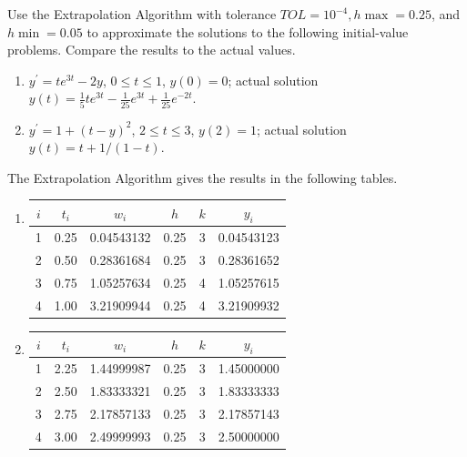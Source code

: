 \begin{myexercise}%
Use the Extrapolation Algorithm with tolerance $T O L=10^{-4}, h \max =0.25$, and $h \min =0.05$ to approximate the solutions to the following initial-value problems. Compare the results to the actual values.\\
\begin{enumerate}[label=(\alph*)]
\item $y^{\prime}=t e^{3 t}-2 y$, $0 \leq t \leq 1$, $y(0)=0$; actual solution $y(t)=\frac{1}{5} t e^{3 t}-\frac{1}{25} e^{3 t}+\frac{1}{25} e^{-2 t}$.\\
\item $y^{\prime}=1+(t-y)^{2}$, $2 \leq t \leq 3$, $y(2)=1$; actual solution $y(t)=t+1 /(1-t)$.
\end{enumerate}

\begin{mysolution}
The Extrapolation Algorithm gives the results in the following tables.\\
\begin{enumerate}[label=(\alph*)]
\item
\begin{center}
\begin{tabular}{cccccc}
\hline
$i$ & $t_{i}$ & $w_{i}$ & $h$ & $k$ & $y_{i}$ \\
\hline
1 & 0.25 & 0.04543132 & 0.25 & 3 & 0.04543123 \\
2 & 0.50 & 0.28361684 & 0.25 & 3 & 0.28361652 \\
3 & 0.75 & 1.05257634 & 0.25 & 4 & 1.05257615 \\
4 & 1.00 & 3.21909944 & 0.25 & 4 & 3.21909932 \\
\hline
\end{tabular}
\end{center}

\item

\begin{center}
\begin{tabular}{cccccc}
\hline
$i$ & $t_{i}$ & $w_{i}$ & $h$ & $k$ & $y_{i}$ \\
\hline
1 & 2.25 & 1.44999987 & 0.25 & 3 & 1.45000000 \\
2 & 2.50 & 1.83333321 & 0.25 & 3 & 1.83333333 \\
3 & 2.75 & 2.17857133 & 0.25 & 3 & 2.17857143 \\
4 & 3.00 & 2.49999993 & 0.25 & 3 & 2.50000000 \\
\hline
\end{tabular}
\end{center}
\end{enumerate}
\end{mysolution}
\end{myexercise}



